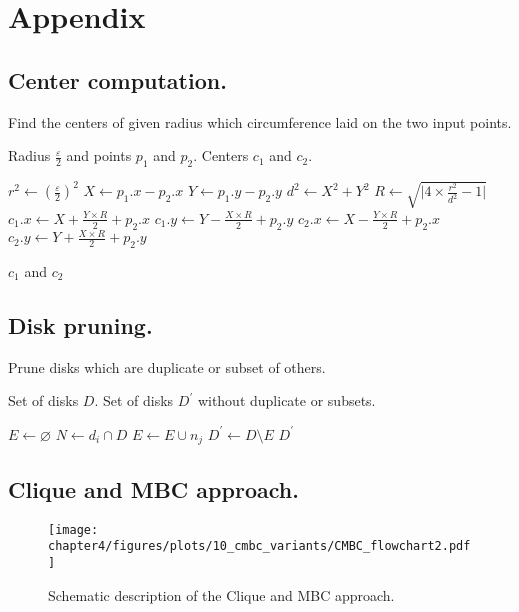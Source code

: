 \clearpage
\appendix

\renewcommand\appendixname{}
\renewcommand\appendixpagename{}
\renewcommand{\thechapter}{}
\renewcommand{\thesection}{\Alph{section}}

\chapter{Appendix}
\section{Center computation.}
{\ssp
\begin{algorithm}[h!]
    \caption{Find the centers of given radius which circumference laid on the two input points.}
    \begin{algorithmic}[1]
        \Require Radius $\frac{\varepsilon}{2}$ and points $p_1$ and $p_2$.
        \Ensure Centers $c_1$ and $c_2$.
        
        \State $r^2 \gets (\frac{\varepsilon}{2})^2$
        \State $X \gets p_1.x - p_2.x$
        \State $Y \gets p_1.y - p_2.y$
        \State $d^2 \gets X^2 + Y^2$
        \State $R \gets \sqrt{\lvert 4 \times \frac{r^2}{d^2} - 1 \rvert}$
        \State $c_1.x \gets X + \frac{Y \times R}{2} + p_2.x$
        \State $c_1.y \gets Y - \frac{X \times R}{2} + p_2.y$
        \State $c_2.x \gets X - \frac{Y \times R}{2} + p_2.x$
        \State $c_2.y \gets Y + \frac{X \times R}{2} + p_2.y$
        
        \State \Return $c_1$ and $c_2$
        \EndFunction
    \end{algorithmic}
    \label{app:centers}
\end{algorithm}
}

\clearpage
\section{Disk pruning.}
{\ssp
\begin{algorithm}[h!]
    \caption{Prune disks which are duplicate or subset of others.}
     \begin{algorithmic}[1]
         \Require Set of disks $D$.
         \Ensure Set of disks $D^{\prime}$ without duplicate or subsets.
         
         \State $E \gets \varnothing$
             \State $N \gets d_i \cap D$
                         \State $E \gets E \cup {n_j}$
                 \EndIf
             \EndFor
         \EndFor        
         \State $D^{\prime} \gets D \setminus E$
         \State \Return $D^{\prime}$
         \EndFunction
     \end{algorithmic}
    \label{app:disks}
\end{algorithm}
}

\clearpage
\section{Clique and MBC approach.}\label{app:cmbc_flowchar}
\begin{figure}[h!]
    \centering
    \texttt{[image: chapter4/figures/plots/10\_cmbc\_variants/CMBC\_flowchart2.pdf]}
    \caption{Schematic description of the Clique and MBC approach.}
\end{figure}

